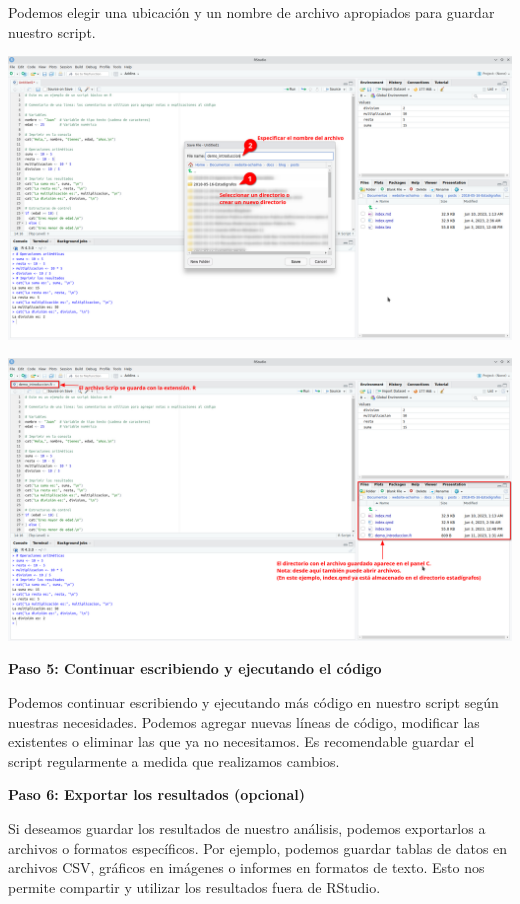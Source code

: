 \documentclass[
  a4paper,
]{article}
\begin{document}
Podemos elegir una ubicación y un nombre de archivo apropiados para
guardar nuestro script.

\includegraphics{images/Screenshot_20230611_012736.png}

\includegraphics{images/Screenshot_20230611_013135.png}

\textbf{Paso 5: Continuar escribiendo y ejecutando el código}

Podemos continuar escribiendo y ejecutando más código en nuestro script
según nuestras necesidades. Podemos agregar nuevas líneas de código,
modificar las existentes o eliminar las que ya no necesitamos. Es
recomendable guardar el script regularmente a medida que realizamos
cambios.

\textbf{Paso 6: Exportar los resultados (opcional)}

Si deseamos guardar los resultados de nuestro análisis, podemos
exportarlos a archivos o formatos específicos. Por ejemplo, podemos
guardar tablas de datos en archivos CSV, gráficos en imágenes o informes
en formatos de texto. Esto nos permite compartir y utilizar los
resultados fuera de RStudio.
\end{document}
